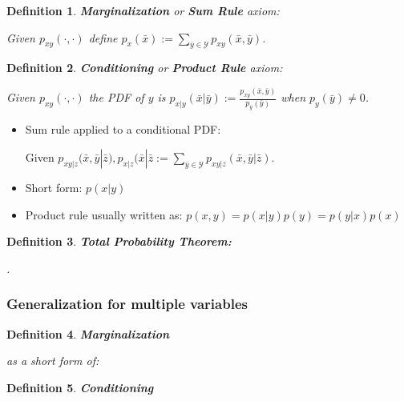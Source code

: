\documentclass[10pt,a4paper]{scrartcl}
\newtheorem{define}{Definition}
\begin{document}
\begin{multicols*}{2}
\begin{define}
\textbf{Marginalization} or \textbf{Sum Rule} axiom:

Given $p_{xy}(\cdot,\cdot)$ define $p_x(\bar{x}):=\sum\limits_{\bar{y}\in\mathcal{Y}}p_{xy}(\bar{x},\bar{y})$.
\end{define}

\begin{define}
\textbf{Conditioning} or \textbf{Product Rule} axiom:

Given $p_{xy}(\cdot,\cdot)$ the PDF of $y$ is $p_{x|y}(\bar{x}|\bar{y}):=\frac{p_{xy}(\bar{x},\bar{y})}{p_y(\bar{y})}$ when $p_y(\bar{y})\neq 0$.
\end{define}

\begin{itemize}
\item Sum rule applied to a conditional PDF:

Given $p_{xy|z}(\bar{x},\bar{y}|\bar{z}),p_{x|z}(\bar{x}|\bar{z}:=\sum\limits_{\bar{y}\in\mathcal{Y}}p_{xy|z}(\bar{x},\bar{y}|\bar{z})$.
\item Short form: $p(x|y)$
\item Product rule usually written as: $p(x,y) = p(x|y)p(y) =p(y|x)p(x)$
\end{itemize}

\begin{define}
\textbf{Total Probability Theorem:}

.
\end{define}

\subsubsection{Generalization for multiple variables}

\begin{define}
\textbf{Marginalization}


as a short form of:

\end{define}

\begin{define}
\textbf{Conditioning}


\end{define}
\end{multicols*}
\end{document}

